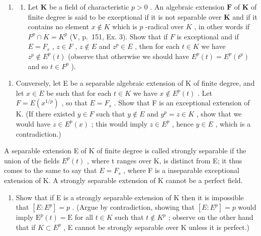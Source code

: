 \begin{enumerate}
\def\labelenumi{\arabic{enumi})}
\tightlist
\item
  \begin{enumerate}
  \def\labelenumii{\alph{enumii})}
  \tightlist
  \item
    Let \(\mathbf{K}\) be a field of characteristic \(p > 0\) . An algebraic extension \(\mathbf{F}\) of \(\mathbf{K}\) of finite degree is said to be exceptional if it is not separable over \(\mathbf{K}\) and if it contains no element \(x \notin K\) which is \(p\) -radical over \(K\) , in other words if \(F^p \cap K = K^p\) (V, p.~151, Ex. 3). Show that if \(F\) is exceptional and if \(E = F_s\) , \(z \in F\) , \(z \notin E\) and \(z^p \in E\) , then for each \(t \in K\) we have \(z^p \notin E^p(t)\) (observe that otherwise we should have \(E^p(t) = E^p(t^p)\) and so \(t \in F^p\) ).
  \end{enumerate}
\end{enumerate}

\begin{enumerate}
\def\labelenumi{\alph{enumi})}
\setcounter{enumi}{1}
\tightlist
\item
  Conversely, let E be a separable algebraic extension of K of finite degree, and let \(x \in E\) be such that for each \(t \in K\) we have \(x \notin E^p(t)\) . Let \(F = E(x^{1/p})\) , so that \(E = F_s\) . Show that F is an exceptional extension of K. (If there existed \(y \in F\) such that \(y \notin E\) and \(y^p = z \in K\) , show that we would have \(z \in E^p(x)\) ; this would imply \(z \in E^p\) , hence \(y \in E\) , which is a contradiction.)
\end{enumerate}

A separable extension E of K of finite degree is called strongly separable if the union of the fields \(E^{p}(t)\) , where t ranges over K, is distinct from E; it thus comes to the same to say that \(E = F_{s}\) , where F is a inseparable exceptional extension of K. A strongly separable extension of K cannot be a perfect field.

\begin{enumerate}
\def\labelenumi{\alph{enumi})}
\setcounter{enumi}{2}
\tightlist
\item
  Show that if E is a strongly separable extension of K then it is impossible that \([E:E^{p}]=p\) . (Argue by contradiction, showing that \([E:E^{p}]=p\) would imply \(\mathrm{E}^{p}(t)=\mathrm{E}\) for all \(t\in K\) such that \(t\notin K^{p}\) ; observe on the other hand that if \(K\subset E^{p}\) , E cannot be strongly separable over K unless it is perfect.)
\end{enumerate}

